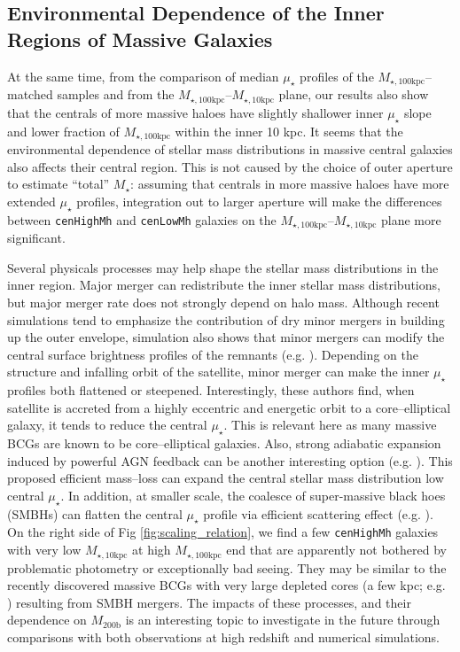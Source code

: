 \documentclass[a4paper,fleqn,usenatbib]{mnras}
\def\rbcg{\texttt{cenHighMh}}
\def\nbcg{\texttt{cenLowMh}}
\def\mstar{{$M_{\star}$}}
\def\mhalo{{$M_{\mathrm{200b}}$}}
\def\minn{{$M_{\star,10\mathrm{kpc}}$}}
\def\mtot{{$M_{\star,100\mathrm{kpc}}$}}
\def\mden{{$\mu_{\star}$}}
\begin{document}
\subsection{Environmental Dependence of the Inner Regions of Massive Galaxies}
    
    At the same time, from the comparison of median \mden{} profiles of the 
    \mtot{}--matched samples and from the \mtot{}--\minn{} plane, our results also 
    show that the centrals of more massive haloes have slightly shallower inner 
    \mden{} slope and lower fraction of \mtot{} within the inner 10 kpc.
    It seems that the environmental dependence of stellar mass distributions in 
    massive central galaxies also affects their central region.
    This is not caused by the choice of outer aperture to estimate ``total''
    \mstar{}: assuming that centrals in more massive haloes have more extended 
    \mden{} profiles, integration out to larger aperture will make the differences 
    between \rbcg{} and \nbcg{} galaxies on the \mtot{}--\minn{} plane more 
    significant. 
    
    Several physicals processes may help shape the stellar mass distributions in the 
    inner region. 
    Major merger can redistribute the inner stellar mass distributions, but major
    merger rate does not strongly depend on halo mass. 
    Although recent simulations tend to emphasize the contribution of dry minor 
    mergers in building up the outer envelope, simulation also shows that minor 
    mergers can modify the central surface brightness profiles of the remnants
    (e.g. \citealt{BoylanKolchin2007}). 
    Depending on the structure and infalling orbit of the satellite, minor merger 
    can make the inner \mden{} profiles both flattened or steepened.  
    Interestingly, these authors find, when satellite is accreted from a highly 
    eccentric and energetic orbit to a core--elliptical galaxy, it tends to reduce 
    the central \mden{}.  
    This is relevant here as many massive BCGs are known to be core--elliptical 
    galaxies. 
    Also, strong adiabatic expansion induced by powerful AGN feedback can be another 
    interesting option (e.g. \citealt{Fan2008}). 
    This proposed efficient mass--loss can expand the central stellar mass 
    distribution low central \mden{}.  
    In addition, at smaller scale, the coalesce of super-massive black hoes (SMBHs)  
    can flatten the central \mden{} profile via efficient scattering effect 
    (e.g. \citealt{Milosavljevi2002}).
    On the right side of Fig \ref{fig:scaling_relation}, we find a few \rbcg{} 
    galaxies with very low \minn{} at high \mtot{} end that are apparently not bothered 
    by problematic photometry or exceptionally bad seeing.  
    They may be similar to the recently discovered massive BCGs with very large 
    depleted cores (a few kpc; e.g. \citealt{Postman2012, LopezCruz2014, Thomas2016,
    Bonfini2016}) resulting from SMBH mergers.
    The impacts of these processes, and their dependence on \mhalo{} is an interesting 
    topic to investigate in the future through comparisons with both observations 
    at high redshift and numerical simulations. 
\end{document}
